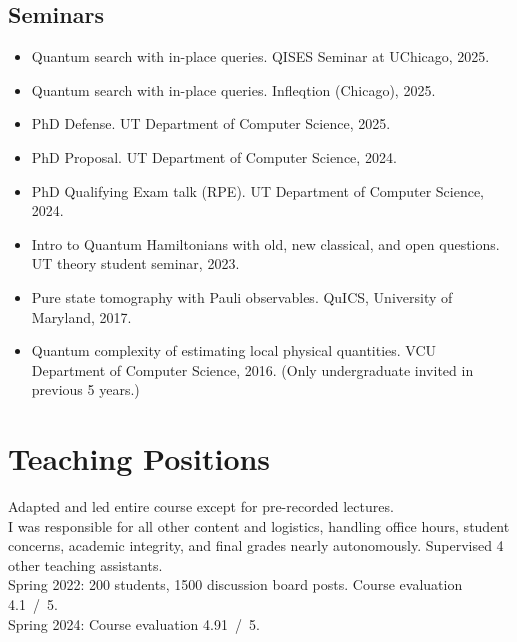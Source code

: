 \documentclass[11pt,letterpaper,serif]{moderncv}
\begin{document}
\subsection{Seminars}

\begin{itemize}
	\item[\textbullet] Quantum search with in-place queries.\quad
	QISES Seminar at UChicago, 2025.

	\item[\textbullet] Quantum search with in-place queries.\quad
	Infleqtion (Chicago), 2025.

	\item[\textbullet] PhD Defense.\quad
	UT Department of Computer Science, 2025.

	\item[\textbullet] PhD Proposal.\quad
	UT Department of Computer Science, 2024.

	\item[\textbullet] PhD Qualifying Exam talk (RPE).\quad
	UT Department of Computer Science, 2024.

	\item[\textbullet] Intro to Quantum Hamiltonians with old, new classical, and open questions.\quad
	UT theory student seminar, 2023.

	\item[\textbullet] Pure state tomography with Pauli observables.\quad
	QuICS, University of Maryland, 2017.

	\item[\textbullet] Quantum complexity of estimating local physical quantities.\quad
	VCU Department of Computer Science, 2016.\quad
	(Only undergraduate invited in previous 5 years.)
\end{itemize}


\section{Teaching Positions}

{
	\begin{adjustwidth}{.25in}{}
		Adapted and led entire course except for pre-recorded lectures.\\
		I was responsible for all other content and logistics, handling office hours, student concerns, academic integrity, and final grades nearly autonomously.
		Supervised 4 other teaching assistants.\\
		Spring 2022: 200 students, 1500 discussion board posts. Course evaluation 4.1~/~5.
		\\ Spring 2024: Course evaluation 4.91~/~5.
	\end{adjustwidth}
}
\end{document}
